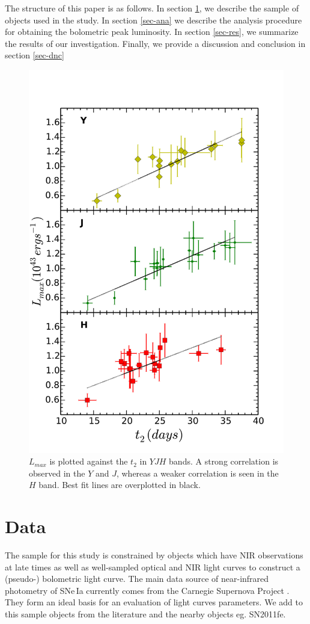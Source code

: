\documentclass{aa}
\begin{document}
The structure of this paper is as follows. In section \ref{sec:data}, we describe the sample of objects used in the study. In section \ref{sec-ana} we describe the analysis procedure for obtaining the bolometric peak luminosity. In section \ref{sec-res}, we summarize the results of our investigation. Finally, we provide a discussion and conclusion in section \ref{sec-dnc}



\begin{figure}
\centering
\includegraphics[width=.50\textwidth, height=0.6\textheight]{../plot_rel/lbolt2_bf.pdf}
\caption{$L_{max}$ is plotted against the $t_2$ in $YJH$ bands. A strong correlation is observed in the $Y$ and $J$, whereas a weaker correlation is seen in the $H$ band. Best fit lines are overplotted in black.}
\label{fig:nit2}
\end{figure}



\section{Data} 
\label{sec:data}
%


The sample for this study is constrained by objects which have NIR observations at late times as well as well-sampled optical and NIR light curves to
construct a (pseudo-) bolometric light curve. The main data source of
near-infrared photometry of SNe\,Ia currently comes from the Carnegie
Supernova Project \citep[CSP;][]{Contreras2010,Burns2011,Stritzinger2011,Phillips2012,Burns2014}.
They form an ideal basis for an evaluation of light curves parameters.
We add to this sample objects from the literature and the nearby objects eg. SN2011fe.
\end{document}
